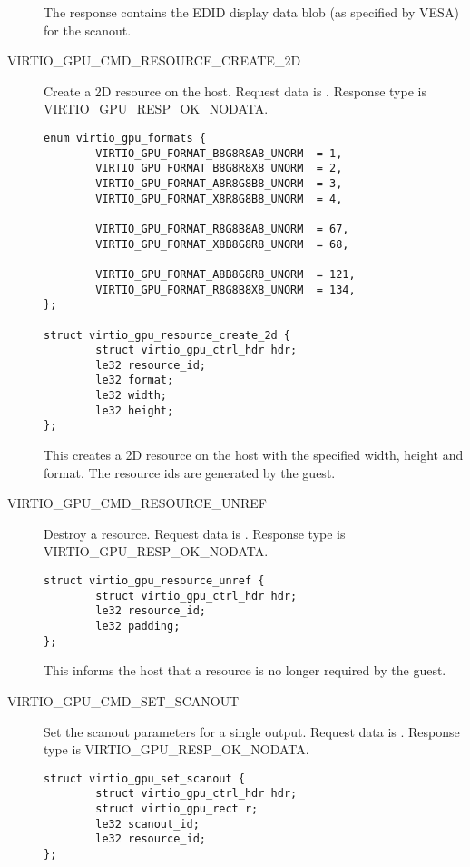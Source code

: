 \begin{description}
The response contains the EDID display data blob (as specified by
VESA) for the scanout.

\item[VIRTIO_GPU_CMD_RESOURCE_CREATE_2D] Create a 2D resource on the
  host.  Request data is .
  Response type is VIRTIO_GPU_RESP_OK_NODATA.

\begin{lstlisting}
enum virtio_gpu_formats {
        VIRTIO_GPU_FORMAT_B8G8R8A8_UNORM  = 1,
        VIRTIO_GPU_FORMAT_B8G8R8X8_UNORM  = 2,
        VIRTIO_GPU_FORMAT_A8R8G8B8_UNORM  = 3,
        VIRTIO_GPU_FORMAT_X8R8G8B8_UNORM  = 4,

        VIRTIO_GPU_FORMAT_R8G8B8A8_UNORM  = 67,
        VIRTIO_GPU_FORMAT_X8B8G8R8_UNORM  = 68,

        VIRTIO_GPU_FORMAT_A8B8G8R8_UNORM  = 121,
        VIRTIO_GPU_FORMAT_R8G8B8X8_UNORM  = 134,
};

struct virtio_gpu_resource_create_2d {
        struct virtio_gpu_ctrl_hdr hdr;
        le32 resource_id;
        le32 format;
        le32 width;
        le32 height;
};
\end{lstlisting}

This creates a 2D resource on the host with the specified width,
height and format.  The resource ids are generated by the guest.

\item[VIRTIO_GPU_CMD_RESOURCE_UNREF] Destroy a resource.  Request data
  is .  Response type is
  VIRTIO_GPU_RESP_OK_NODATA.

\begin{lstlisting}
struct virtio_gpu_resource_unref {
        struct virtio_gpu_ctrl_hdr hdr;
        le32 resource_id;
        le32 padding;
};
\end{lstlisting}

This informs the host that a resource is no longer required by the
guest.

\item[VIRTIO_GPU_CMD_SET_SCANOUT] Set the scanout parameters for a
  single output.  Request data is .  Response type is
  VIRTIO_GPU_RESP_OK_NODATA.

\begin{lstlisting}
struct virtio_gpu_set_scanout {
        struct virtio_gpu_ctrl_hdr hdr;
        struct virtio_gpu_rect r;
        le32 scanout_id;
        le32 resource_id;
};
\end{lstlisting}


\end{description}
